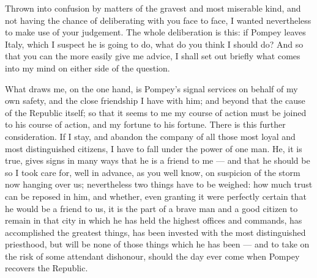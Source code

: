 

 Thrown into confusion by matters of the gravest and most miserable kind, and not having the chance of deliberating with you face to face, I wanted nevertheless to make use of your judgement. The whole deliberation is this: if Pompey leaves Italy, which I suspect he is going to do, what do you think I should do? And so that you can the more easily give me advice, I shall set out briefly what comes into my mind on either side of the question.

 What draws me, on the one hand, is Pompey's signal services on behalf of my own safety, and the close friendship I have with him; and beyond that the cause of the Republic itself; so that it seems to me my course of action must be joined to his course of action, and my fortune to his fortune. There is this further consideration. If I stay, and abandon the company of all those most loyal and most distinguished citizens, I have to fall under the power of one man. He, it is true, gives signs in many ways that he is a friend to me --- and that he should be so I took care for, well in advance, as you well know, on suspicion of the storm now hanging over us; nevertheless two things have to be weighed: how much trust can be reposed in him, and whether, even granting it were perfectly certain that he would be a friend to us, it is the part of a brave man and a good citizen to remain in that city in which he has held the highest offices and commands, has accomplished the greatest things, has been invested with the most distinguished priesthood, but will be none of those things which he has been --- and to take on the risk of some attendant dishonour, should the day ever come when Pompey recovers the Republic.

